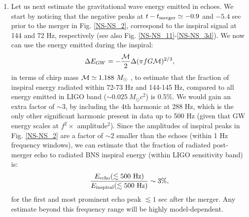 \documentclass[a4paper,11pt]{article}
\newcommand{\be}{\begin{equation}}
\newcommand{\ee}{\end{equation}}
\begin{document}
\begin{enumerate}
\item Let us next estimate the gravitational wave energy emitted in echoes. %
%
%
%
%
%
%
We start by noticing that the negative peaks at $t-t_{\rm merger} \simeq -0.9$ and $-5.4$ sec prior to the merger in Fig. \ref{NS-NS_2}, correspond to the inspiral signal at 144 and 72 Hz, respectively (see also Fig. \ref{NS-NS_11}-\ref{NS-NS_3d}). We now can use the energy emitted during the inspiral:
\be
\Delta E_{GW} = -\frac{{\cal M}}{2}\Delta (\pi f G {\cal M})^{2/3}, 
\ee  
in terms of chirp mass ${\cal M} \simeq 1.188 ~M_\odot$ \cite{TheLIGOScientific:2017qsa}, to estimate that the fraction of inspiral energy radiated within 72-73 Hz and 144-145 Hz, compared to all energy emitted in LIGO band ($\sim 0.025~ M_\odot c^2$) is 0.5\%. We would gain an extra factor of $\sim 3$, by including the 4th harmonic at 288 Hz, which is the only other significant harmonic present in data up to 500 Hz  (given that GW energy scales at $f^2 \times$ amplitude$^2$).  Since the amplitudes of inspiral peaks in Fig. \ref{NS-NS_2} are a factor of $\sim 2$ smaller than the echoes (within 1 Hz frequency windows), we can estimate that the fraction of radiated post-merger echo to radiated BNS inspiral energy (within LIGO sensitivity band) is:
\be
\frac{E_{\rm echo}(\lesssim 500 ~{\rm Hz})}{E_{\rm inspiral}(\lesssim 500 ~{\rm Hz})} \sim 3\%,
\ee
for the first and most prominent echo peak $\lesssim 1$ sec after the merger. Any estimate beyond this frequency range will be highly model-dependent. 


\end{enumerate}
\end{document}

